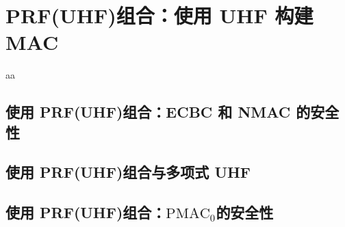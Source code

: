 \section{PRF(UHF)组合：使用 UHF 构建 MAC}

\begin{theorem}\label{theo:7-7}
aa
\end{theorem}

\subsection{使用 PRF(UHF)组合：ECBC 和 NMAC 的安全性}\label{subsec:7-3-1}
\subsection{使用 PRF(UHF)组合与多项式 UHF}\label{subsec:7-3-2}
\subsection{使用 PRF(UHF)组合：$\mathrm{PMAC}_0$的安全性}\label{subsec:7-3-3}
